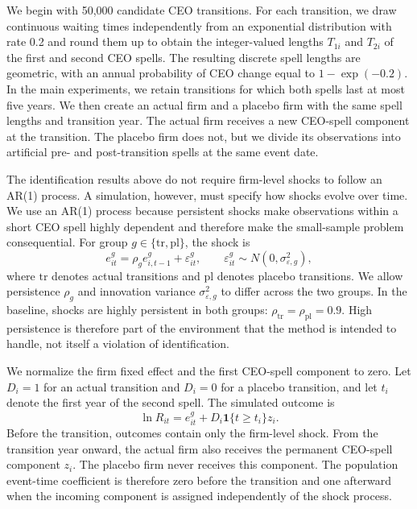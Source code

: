 \documentclass[sigconf,nonacm]{acmart}
\begin{document}
We begin with 50,000 candidate CEO transitions. For each transition, we draw continuous waiting times independently from an exponential distribution with rate 0.2 and round them up to obtain the integer-valued lengths \(T_{1i}\) and \(T_{2i}\) of the first and second CEO spells. The resulting discrete spell lengths are geometric, with an annual probability of CEO change equal to \(1-\exp(-0.2)\). In the main experiments, we retain transitions for which both spells last at most five years. We then create an actual firm and a placebo firm with the same spell lengths and transition year. The actual firm receives a new CEO-spell component at the transition. The placebo firm does not, but we divide its observations into artificial pre- and post-transition spells at the same event date.

The identification results above do not require firm-level shocks to follow an AR(1) process. A simulation, however, must specify how shocks evolve over time. We use an AR(1) process because persistent shocks make observations within a short CEO spell highly dependent and therefore make the small-sample problem consequential. For group \(g\in\{\mathrm{tr},\mathrm{pl}\}\), the shock is
\begin{equation}
e_{it}^{g}
=
\rho_g e_{i,t-1}^{g}
+
\varepsilon_{it}^{g},
\qquad
\varepsilon_{it}^{g}
\sim
N\!\left(0,\sigma_{\varepsilon,g}^{2}\right),
\label{eq:mc_shock_process}
\end{equation}
where \(\mathrm{tr}\) denotes actual transitions and \(\mathrm{pl}\) denotes placebo transitions. We allow persistence \(\rho_g\) and innovation variance \(\sigma_{\varepsilon,g}^{2}\) to differ across the two groups. In the baseline, shocks are highly persistent in both groups: \(\rho_{\mathrm{tr}}=\rho_{\mathrm{pl}}=0.9\). High persistence is therefore part of the environment that the method is intended to handle, not itself a violation of identification.

We normalize the firm fixed effect and the first CEO-spell component to zero. Let \(D_i=1\) for an actual transition and \(D_i=0\) for a placebo transition, and let \(t_i\) denote the first year of the second spell. The simulated outcome is
\begin{equation}
\ln R_{it}
=
e_{it}^{g}
+
D_i\mathbf{1}\{t\geq t_i\}z_i.
\label{eq:mc_outcome}
\end{equation}
Before the transition, outcomes contain only the firm-level shock. From the transition year onward, the actual firm also receives the permanent CEO-spell component \(z_i\). The placebo firm never receives this component. The population event-time coefficient is therefore zero before the transition and one afterward when the incoming component is assigned independently of the shock process.
\end{document}
